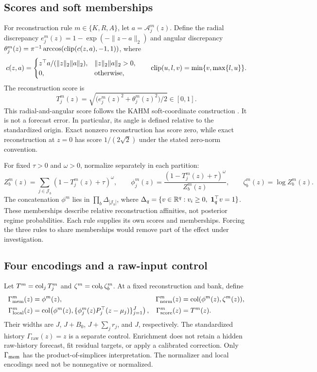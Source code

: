 \subsection{Scores and soft memberships}
For reconstruction rule $m\in\{K,R,A\}$, let $a=\mathcal A^m_j(z)$. Define the radial discrepancy $e_j^m(z)=1-\exp(-\|z-a\|_2)$ and angular discrepancy $\theta_j^m(z)=\pi^{-1}\arccos(\operatorname{clip}(c(z,a),-1,1))$, where
\[
 c(z,a)=\begin{cases}z^\top a/(\|z\|_2\|a\|_2),&\|z\|_2\|a\|_2>0,\\0,&\text{otherwise},\end{cases}
 \qquad \operatorname{clip}(u,l,v)=\min\{v,\max\{l,u\}\}.
\]
The reconstruction score is
\begin{equation}
 T_j^m(z)=\sqrt{\bigl(e_j^m(z)^2+\theta_j^m(z)^2\bigr)/2}\in[0,1].
\label{eq:score}
\end{equation}
This radial-and-angular score follows the KAHM soft-coordinate construction \citep{KumarKargaran2026Limits}. It is not a forecast error. In particular, its angle is defined relative to the standardized origin. Exact nonzero reconstruction has score zero, while exact reconstruction at $z=0$ has score $1/(2\sqrt2)$ under the stated zero-norm convention.

For fixed $\tau>0$ and $\omega>0$, normalize separately in each partition:
\begin{equation}
 Z_b^m(z)=\sum_{j\in\mathcal J_b}(1-T_j^m(z)+\tau)^\omega,\qquad
 \phi_j^m(z)=\frac{(1-T_j^m(z)+\tau)^\omega}{Z_b^m(z)},\qquad
 \zeta_b^m(z)=\log Z_b^m(z).
\label{eq:memberships}
\end{equation}
The concatenation $\phi^m$ lies in $\prod_b\Delta_{|\mathcal J_b|}$, where $\Delta_q=\{v\in\R^q:v_i\geq0,\ \mathbf1_q^\top v=1\}$. These memberships describe relative reconstruction affinities, not posterior regime probabilities. Each rule supplies its own scores and memberships. Forcing the three rules to share memberships would remove part of the effect under investigation.

\subsection{Four encodings and a raw-input control}
Let $T^m=\operatorname{col}_j T_j^m$ and $\zeta^m=\operatorname{col}_b\zeta_b^m$. At a fixed reconstruction and bank, define
\begin{align}
 \Gamma^m_{\mathrm{mem}}(z)&=\phi^m(z),&
 \Gamma^m_{\mathrm{norm}}(z)&=\operatorname{col}(\phi^m(z),\zeta^m(z)),\nonumber\\
 \Gamma^m_{\mathrm{local}}(z)&=\operatorname{col}\!\left(\phi^m(z),\{\phi_j^m(z)P_j^\top(z-\mu_j)\}_{j=1}^J\right),&
 \Gamma^m_{\mathrm{score}}(z)&=T^m(z).\label{eq:encodings}
\end{align}
Their widths are $J$, $J+B_0$, $J+\sum_jr_j$, and $J$, respectively. The standardized history $\Gamma_{\mathrm{raw}}(z)=z$ is a separate control. Enrichment does not retain a hidden raw-history forecast, fit residual targets, or apply a calibrated correction. Only $\Gamma_{\mathrm{mem}}$ has the product-of-simplices interpretation. The normalizer and local encodings need not be nonnegative or normalized.
